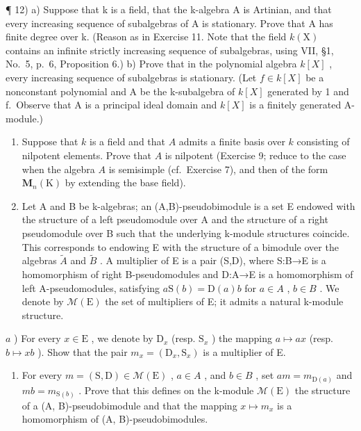 ¶ 12) a) Suppose that k is a field, that the k-algebra A is Artinian, and that every increasing sequence of subalgebras of A is stationary. Prove that A has finite degree over k. (Reason as in Exercise 11. Note that the field \(k(\mathrm{X})\) contains an infinite strictly increasing sequence of subalgebras, using VII, §1, No.~5, p.~6, Proposition 6.) b) Prove that in the polynomial algebra \(k[X]\) , every increasing sequence of subalgebras is stationary. (Let \(f \in k[X]\) be a nonconstant polynomial and A be the k-subalgebra of \(k[X]\) generated by 1 and f.~Observe that A is a principal ideal domain and \(k[X]\) is a finitely generated A-module.)

\begin{enumerate}
\def\labelenumi{\arabic{enumi})}
\setcounter{enumi}{12}
\item
  Suppose that \(k\) is a field and that \(A\) admits a finite basis over \(k\) consisting of nilpotent elements. Prove that \(A\) is nilpotent (Exercise 9; reduce to the case when the algebra \(A\) is semisimple (cf.~Exercise 7), and then of the form \(\mathbf{M}_n(\mathrm{K})\) by extending the base field).
\item
  Let A and B be k-algebras; an (A,B)-pseudobimodule is a set E endowed with the structure of a left pseudomodule over A and the structure of a right pseudomodule over B such that the underlying k-module structures coincide. This corresponds to endowing E with the structure of a bimodule over the algebras \(\widetilde{A}\) and \(\widetilde{B}\) . A multiplier of E is a pair (S,D), where S:B→E is a homomorphism of right B-pseudomodules and D:A→E is a homomorphism of left A-pseudomodules, satisfying \(a\mathrm{S}(b)=\mathrm{D}(a)b\) for \(a\in A\) , \(b\in B\) . We denote by \(\mathcal{M}(\mathrm{E})\) the set of multipliers of E; it admits a natural k-module structure.
\end{enumerate}

\(a\) ) For every \(x\in \mathrm{E}\) , we denote by \(\mathrm{D}_x\) (resp. \(\mathrm{S}_x\) ) the mapping \(a\mapsto ax\) (resp. \(b\mapsto xb\) ). Show that the pair \(m_{x} = (\mathrm{D}_{x},\mathrm{S}_{x})\) is a multiplier of E.

\begin{enumerate}
\def\labelenumi{\alph{enumi})}
\setcounter{enumi}{1}
\tightlist
\item
  For every \(m = (\mathrm{S}, \mathrm{D}) \in \mathcal{M}(\mathrm{E})\) , \(a \in A\) , and \(b \in B\) , set \(am = m_{\mathrm{D}(a)}\) and \(mb = m_{\mathrm{S}(b)}\) . Prove that this defines on the k-module \(\mathcal{M}(\mathrm{E})\) the structure of a (A, B)-pseudobimodule and that the mapping \(x \mapsto m_x\) is a homomorphism of (A, B)-pseudobimodules.
\end{enumerate}

